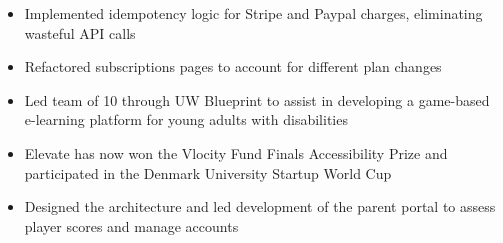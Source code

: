\documentclass[10pt,a4paper,ragged2e]{altacv}
\begin{document}

\begin{fullwidth}
\makecvheader
\end{fullwidth}



\begin{itemize}
\item Implemented idempotency logic for Stripe and Paypal charges, \break eliminating wasteful API calls
\item Refactored subscriptions pages to account for different plan changes
\end{itemize}

\divider

\begin{itemize}
\item Led team of 10 through UW Blueprint to assist in developing a game-based e-learning platform for young adults with disabilities
\item Elevate has now won the Vlocity Fund Finals Accessibility Prize and participated in the Denmark University Startup World Cup
\item Designed the architecture and led development of the parent portal to assess player scores and manage accounts
\end{itemize}
\end{document}
